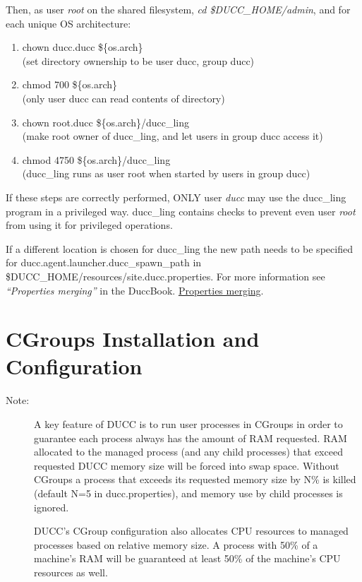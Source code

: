      Then, as user {\em root} on the shared filesystem, {\em cd \$DUCC\_HOME/admin}, and for each unique OS architecture:
     \begin{enumerate}
        \item chown ducc.ducc \$\{os.arch\}
        \\ (set directory ownership to be user ducc, group ducc)
        \item chmod 700 \$\{os.arch\}
        \\ (only user ducc can read contents of directory)
        \item chown root.ducc \$\{os.arch\}/ducc\_ling
        \\ (make root owner of ducc\_ling, and let users in group ducc access it)
        \item chmod 4750 \$\{os.arch\}/ducc\_ling
        \\ (ducc\_ling runs as user root when started by users in group ducc)
     \end{enumerate}
          
If these steps are correctly performed, ONLY user {\em ducc} may use the ducc\_ling program in
a privileged way. ducc\_ling contains checks to prevent even user {\em root} from using it for
privileged operations.

If a different location is chosen for ducc\_ling the new path needs to be specified 
for ducc.agent.launcher.ducc\_spawn\_path in \$DUCC\_HOME/resources/site.ducc.properties.
For more information see
\ifdefined\DUCCSTANDALONE
{\em ``Properties merging''} in the DuccBook. 
\else
\hyperref[sec:admin.properties-merge] {Properties merging}. 
\fi


\section{CGroups Installation and Configuration}

\begin{description}
    \item[Note:] A key feature of DUCC is to run user processes in CGroups in order to guarantee
      each process always has the amount of RAM requested. RAM allocated to the managed process
      (and any child processes) that exceed requested DUCC memory size will be forced into swap space. 
      Without CGroups a process that exceeds its requested memory size by N\% is killed 
      (default N=5 in ducc.properties), and memory use by child processes is ignored.
      
      DUCC's CGroup configuration also allocates CPU resources to managed processes based on
      relative memory size. A process with 50\% of a machine's RAM will be guaranteed at least
      50\% of the machine's CPU resources as well. 
\end{description}

